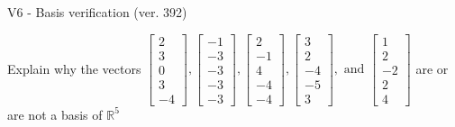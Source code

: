 \begin{exercise}
  \begin{exerciseTitle}V6 - Basis verification (ver. 392)\end{exerciseTitle}
  \begin{exerciseStatement}
    Explain why the vectors \(\left[\begin{array}{r}
2 \\
3 \\
0 \\
3 \\
-4
\end{array}\right] , \left[\begin{array}{r}
-1 \\
-3 \\
-3 \\
-3 \\
-3
\end{array}\right] , \left[\begin{array}{r}
2 \\
-1 \\
4 \\
-4 \\
-4
\end{array}\right] , \left[\begin{array}{r}
3 \\
2 \\
-4 \\
-5 \\
3
\end{array}\right] , \text{ and } \left[\begin{array}{r}
1 \\
2 \\
-2 \\
2 \\
4
\end{array}\right]\) are or are not a basis of \(\mathbb{R}^5\)	



\end{exerciseStatement}
\end{exercise}
